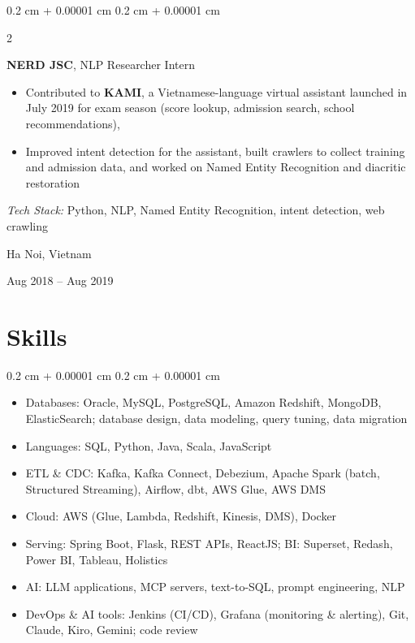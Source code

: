 \documentclass[10pt, letterpaper]{article}
\newenvironment{highlights}{
    \begin{itemize}[
        topsep=0.10 cm,
        parsep=0.10 cm,
        partopsep=0pt,
        itemsep=0pt,
        leftmargin=0.4 cm + 10pt
    ]
    }{
    \end{itemize}
} %
\newenvironment{highlightsforbulletentries}{
    \begin{itemize}[
        topsep=0.10 cm,
        parsep=0.10 cm,
        partopsep=0pt,
        itemsep=0pt,
        leftmargin=10pt
    ]
    }{
    \end{itemize}
} %
\newenvironment{onecolentry}{
    \begin{adjustwidth}{
        0.2 cm + 0.00001 cm
    }{
        0.2 cm + 0.00001 cm
    }
    }{
    \end{adjustwidth}
} %
\newenvironment{twocolentry}[2][]{
    \onecolentry
    \def\secondColumn{#2}
    \setcolumnwidth{\fill, 4.5 cm}
    \begin{paracol}{2}
    }{
        \switchcolumn \raggedleft \secondColumn
    \end{paracol}
    \endonecolentry
} %
\let\hrefWithoutArrow\href
\renewcommand{\href}[2]{\hrefWithoutArrow{#1}{\ifthenelse{\equal{#2}{}}{ }{#2 }\raisebox{.15ex}{\footnotesize \faExternalLink*}}}
\begin{document}
    \vspace{0.2 cm}

    \begin{twocolentry}{
        Ha Noi, Vietnam

        Aug 2018 -- Aug 2019
    }
        \textbf{NERD JSC}, NLP Researcher Intern
        \begin{highlights}
            \item Contributed to \textbf{KAMI}, a Vietnamese-language virtual assistant launched in July 2019 for exam season (score lookup, admission search, school recommendations), \href{https://vnu.edu.vn/kami--tro-li-mua-thi-2019-post24357.html}{featured by VNU}
            \item Improved intent detection for the assistant, built crawlers to collect training and admission data, and worked on Named Entity Recognition and diacritic restoration
        \end{highlights}
        \textit{Tech Stack:} Python, NLP, Named Entity Recognition, intent detection, web crawling
    \end{twocolentry}

    \section{Skills}
    \begin{onecolentry}
        \begin{highlightsforbulletentries}
            \item Databases: Oracle, MySQL, PostgreSQL, Amazon Redshift, MongoDB, ElasticSearch; database design, data modeling, query tuning, data migration
            \item Languages: SQL, Python, Java, Scala, JavaScript
            \item ETL \& CDC: Kafka, Kafka Connect, Debezium, Apache Spark (batch, Structured Streaming), Airflow, dbt, AWS Glue, AWS DMS
            \item Cloud: AWS (Glue, Lambda, Redshift, Kinesis, DMS), Docker
            \item Serving: Spring Boot, Flask, REST APIs, ReactJS; BI: Superset, Redash, Power BI, Tableau, Holistics
            \item AI: LLM applications, MCP servers, text-to-SQL, prompt engineering, NLP
            \item DevOps \& AI tools: Jenkins (CI/CD), Grafana (monitoring \& alerting), Git, Claude, Kiro, Gemini; code review
        \end{highlightsforbulletentries}
    \end{onecolentry}
\end{document}
